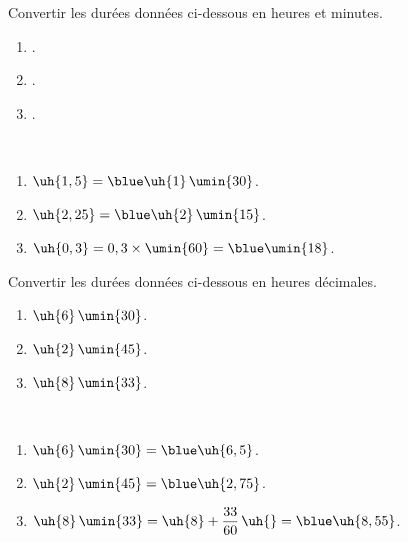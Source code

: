 \exercicesbase

\begin{colonne*exercice}


\bigskip

\begin{exercice} %
   Convertir les durées données ci-dessous en heures et minutes.
   \begin{enumerate}
      \item {}.
      \item {}.
      \item {}.
   \end{enumerate}
\end{exercice}

\begin{corrige}
   \ \\ [-5mm]
   \begin{enumerate}
      \item $\uh{1,5} =\blue \uh{1}\,\umin{30}$.
      \item $\uh{2,25} =\blue \uh{2}\,\umin{15}$.
      \item $\uh{0,3} =0,3\times\umin{60} =\blue \umin{18}$.
   \end{enumerate}
\end{corrige}

\bigskip


\begin{exercice} %
   Convertir les durées données ci-dessous en heures décimales.
   \begin{enumerate}
      \item $\uh{6}\,\umin{30}$.
      \item $\uh{2}\,\umin{45}$.
      \item $\uh{8}\,\umin{33}$.
   \end{enumerate}
\end{exercice}

\begin{corrige}
   \ \\ [-5mm]
   \begin{enumerate}
      \item $\uh{6}\,\umin{30} =\blue \uh{6,5}$.
      \item $\uh{2}\,\umin{45} =\blue \uh{2,75}$. \smallskip
      \item $\uh{8}\,\umin{33} =\uh{8}+\dfrac{33}{60}\,\uh{} =\blue \uh{8,55}$.
   \end{enumerate}
\end{corrige}


\end{colonne*exercice}
